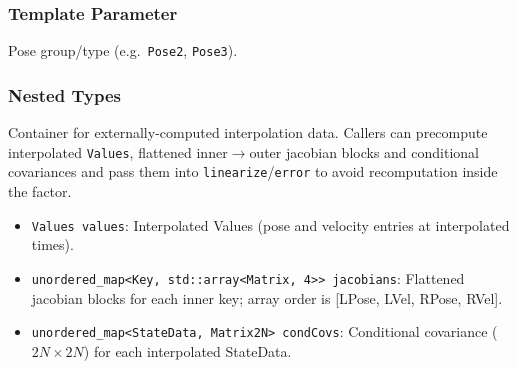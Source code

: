 \documentclass[11pt]{report}
\begin{document}
\subsubsection*{Template Parameter}
\begin{description}[style=nextline,leftmargin=2em]
	\item[\texttt{PoseType}] Pose group/type (e.g.\ \texttt{Pose2}, \texttt{Pose3}).
\end{description}

\subsubsection*{Nested Types}
\begin{description}[style=nextline,leftmargin=2em]
	\item[\texttt{PassedInterpData}]
	Container for externally-computed interpolation data. Callers can precompute interpolated \texttt{Values}, flattened inner$\to$outer jacobian blocks and conditional covariances and pass them into \texttt{linearize}/\texttt{error} to avoid recomputation inside the factor.
	\begin{itemize}[nosep]
		\item \texttt{Values values}: Interpolated Values (pose and velocity entries at interpolated times).
		\item \texttt{unordered\_map<Key, std::array<Matrix, 4>> jacobians}: Flattened jacobian blocks for each inner key; array order is [LPose, LVel, RPose, RVel].
		\item \texttt{unordered\_map<StateData, Matrix2N> condCovs}: Conditional covariance ($2N \times 2N$) for each interpolated StateData.
	\end{itemize}
\end{description}
\end{document}
